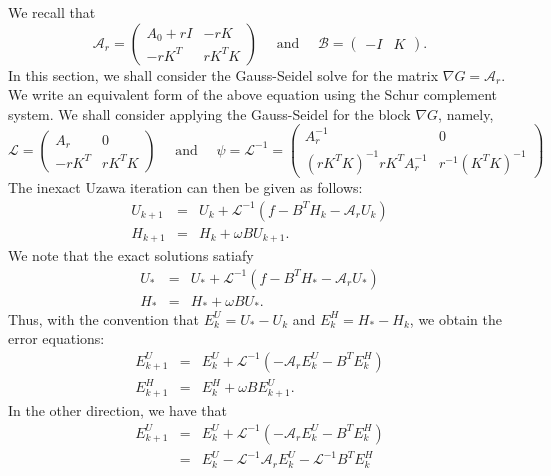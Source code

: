 \begin{itemize}
We recall that 
\begin{equation}
\mathcal{A}_r = \begin{pmatrix} 
A_0 + rI & - rK \\ -rK^T & rK^TK 
\end{pmatrix} 
\quad \mbox{ and } \quad 
\mathcal{B} = \begin{pmatrix} 
-I & K \end{pmatrix}. 
\end{equation} 
In this section, we shall consider the Gauss-Seidel solve for the matrix $ \nabla G = \mathcal{A}_r$. We write an equivalent form of the above equation using the Schur complement system. We shall consider applying the Gauss-Seidel for the block $\nabla G$, namely, 
\begin{equation}
\mathcal{L} = \begin{pmatrix}
A_r & 0\\
-r K^T & rK^T K 
\end{pmatrix} 
\quad \mbox{ and } \quad \psi = \mathcal{L}^{-1} = \begin{pmatrix}
A_r^{-1} & 0\\
(rK^T K)^{-1} rK^T A_r^{-1} & r^{-1} (K^T K)^{-1} 
\end{pmatrix} 
\end{equation}
The inexact Uzawa iteration can then be given as follows: 
\begin{eqnarray}
U_{k+1} &=& U_k + \mathcal{L}^{-1} (f - B^T H_k - \mathcal{A}_r U_k) \\
H_{k+1} &=& H_k + \omega B U_{k+1}. 
\end{eqnarray}
We note that the exact solutions satiafy \begin{eqnarray}
U_{*} &=& U_{*} + \mathcal{L}^{-1} (f - B^T H_{*} - \mathcal{A}_r U_{*}) \\
H_{*} &=& H_{*} + \omega B U_{*}. 
\end{eqnarray}
Thus, with the convention that $E_{k}^U = U_* - U_k$ and $E_{k}^H = H_* - H_k$, we obtain the error equations: 
\begin{eqnarray}
E^U_{k+1} &=& E^U_k + \mathcal{L}^{-1} (- \mathcal{A}_r E^U_k - B^T E^H_k) \\
E^H_{k+1} &=& E^H_k + \omega B E^U_{k+1}. 
\end{eqnarray}
In the other direction, we have that 
\begin{eqnarray}
E^U_{k+1} &=& E^U_k + \mathcal{L}^{-1} (- \mathcal{A}_r  E^U_k - B^T E^H_k) \\
          &=& E^U_k - \mathcal{L}^{-1} \mathcal{A}_r E^U_k - \mathcal{L}^{-1} B^T E^H_k \\

\end{eqnarray}
\end{itemize}
